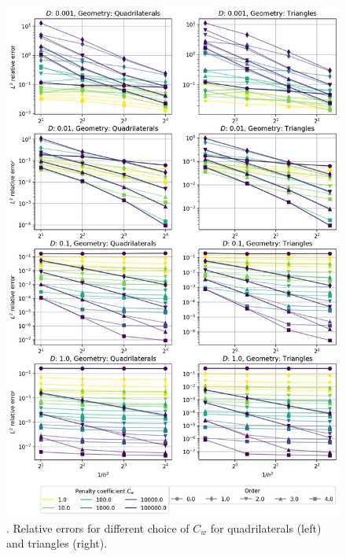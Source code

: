 \begin{figure}[p!]
	\centering
	\includegraphics[height=\textheight]{../figs/parametric/advdiff_2D/quarteroni3.png}

	\caption{. Relative errors for different choice of $C_w$ for
	quadrilaterals (left) and triangles (right).}
	\label{fig:conv_qart3}
\end{figure}